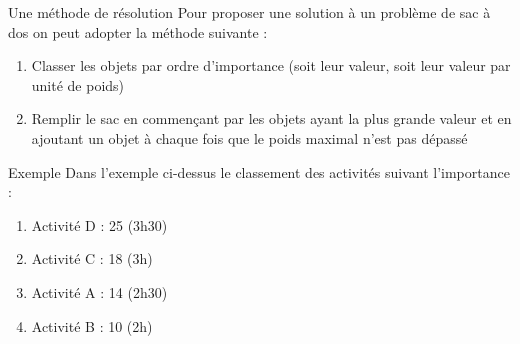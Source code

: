 \documentclass[10pt]{beamer}
\begin{document}
\begin{frame}
    \mframe{\AG}
    \begin{alertblock}{Une méthode de résolution}
        Pour proposer une solution à un problème de sac à dos on peut adopter la méthode suivante :
        \begin{enumerate}
            \item<2-> Classer les objets par ordre d'importance (soit leur valeur, soit leur valeur par unité de poids)
            \item<3-> Remplir le sac en commençant par les objets ayant la plus grande valeur et en ajoutant un objet à chaque fois que le poids maximal n'est pas dépassé
        \end{enumerate}
    \end{alertblock}
\end{frame}

%
\begin{frame}
    \mframe{\AG}
    \begin{exampleblock}{Exemple}
        Dans l'exemple ci-dessus le classement des activités suivant l'importance :
        \begin{enumerate}
            \item<5-> Activité D : 25 (3h30)
            \item<6-> Activité C : 18 (3h)
            \item<7-> Activité A : 14 (2h30)
            \item<8-> Activité B : 10 (2h)
        \end{enumerate}
        \\
    \end{exampleblock}
\end{frame}
\end{document}
